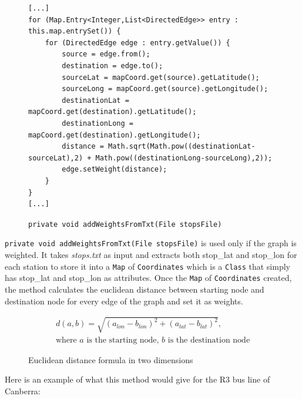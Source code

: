 \documentclass{article}
\begin{document}
\begin{figure}[h]
\begin{verbatim}
[...]
for (Map.Entry<Integer,List<DirectedEdge>> entry : this.map.entrySet()) {
	for (DirectedEdge edge : entry.getValue()) {
		source = edge.from();
		destination = edge.to();
		sourceLat = mapCoord.get(source).getLatitude();
		sourceLong = mapCoord.get(source).getLongitude();
		destinationLat = mapCoord.get(destination).getLatitude();
		destinationLong = mapCoord.get(destination).getLongitude();
		distance = Math.sqrt(Math.pow((destinationLat-sourceLat),2) + Math.pow((destinationLong-sourceLong),2));
		edge.setWeight(distance);
	}
}
[...]
\end{verbatim}
\caption{\texttt{private void addWeightsFromTxt(File stopsFile)}}
\end{figure}

\texttt{private void addWeightsFromTxt(File stopsFile)} is used only if the graph is weighted. It takes \textit{stops.txt} as input and extracts both stop\_lat and stop\_lon for each station to store it into a \texttt{Map} of \texttt{Coordinates} which is a \texttt{Class} that simply has stop\_lat and stop\_lon as attributes. Once the \texttt{Map} of \texttt{Coordinates} created, the method calculates the euclidean distance between starting node and destination node for every edge of the graph and set it as weights.

\begin{figure}[h]
\begin{gather*}
  d(a,b) = \sqrt{(a_{lon} - b_{lon})^2 + (a_{lat} - b_{lat})^2}, \\
  \text{where~$a$ is the starting node,~$b$ is the destination node}
\end{gather*}
\caption{Euclidean distance formula in two dimensions}
\end{figure}

Here is an example of what this method would give for the R3 bus line of Canberra:
\end{document}
